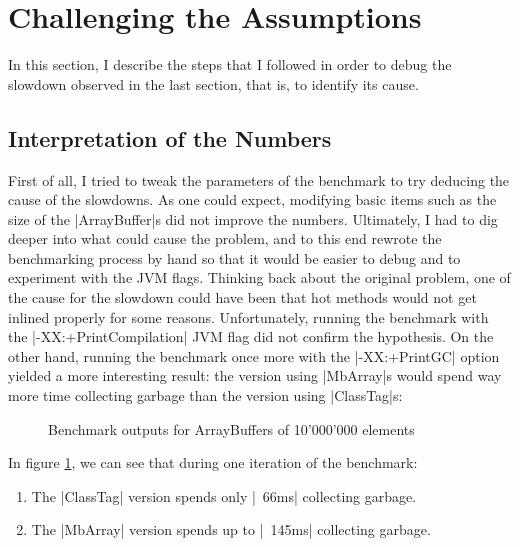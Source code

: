 
\section{Challenging the Assumptions}

In this section, I describe the steps that I followed in order to debug the slowdown observed in the last section, that is, to identify its cause.

\subsection{Interpretation of the Numbers}

First of all, I tried to tweak the parameters of the benchmark to try deducing the cause of the slowdowns. As one could expect, modifying basic items such as the size of the |ArrayBuffer|s did not improve the numbers. Ultimately, I had to dig deeper into what could cause the problem, and to this end rewrote the benchmarking process by hand so that it would be easier to debug and to experiment with the JVM flags. Thinking back about the original problem, one of the cause for the slowdown could have been that hot methods would not get inlined properly for some reasons. Unfortunately, running the benchmark with the |-XX:+PrintCompilation| JVM flag did not confirm the hypothesis. On the other hand, running the benchmark once more with the |-XX:+PrintGC| option yielded a more interesting result: the version using |MbArray|s would spend way more time collecting garbage than the version using |ClassTag|s:

\begin{figure}
\centering
{}
\caption{Benchmark outputs for ArrayBuffers of 10'000'000 elements}\label{fig:BenchOuts}
\label{fig:GcComp}
\end{figure}

In figure \ref{fig:GcComp}, we can see that during one iteration of the benchmark:
\begin{enumerate}
  \item The |ClassTag| version spends only |~66ms| collecting garbage.
  \item The |MbArray| version spends up to |~145ms| collecting garbage. 
\end{enumerate} 

